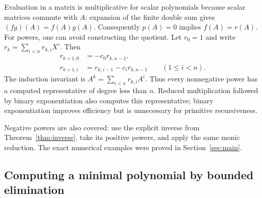 Evaluation in a matrix is multiplicative for scalar polynomials because
scalar matrices commute with $A$: expansion of the finite double sum gives
$(fg)(A)=f(A)g(A)$. Consequently $p(A)=0$ implies $f(A)=r(A)$.
For powers, one can avoid constructing the quotient. Let $r_{0}=1$ and
write $r_k=\sum_{i<n}r_{k,i}X^i$. Then
\begin{align*}
 r_{k+1,0}&=-c_0r_{k,n-1},\\
 r_{k+1,i}&=r_{k,i-1}-c_ir_{k,n-1}\qquad(1\leq i<n).
\end{align*}
The induction invariant is $A^k=\sum_{i<n}r_{k,i}A^i$.
Thus every nonnegative power has a computed representative of degree
less than $n$. Reduced multiplication followed by binary exponentiation
also computes this representative; binary exponentiation improves
efficiency but is unnecessary for primitive recursiveness.

Negative powers are also covered: use the explicit inverse from
Theorem~\ref{thm:inverse}, take its positive powers, and apply the same
monic reduction. The exact numerical examples were proved in
Section~\ref{sec:main}.

\subsection{Computing a minimal polynomial by bounded elimination}

